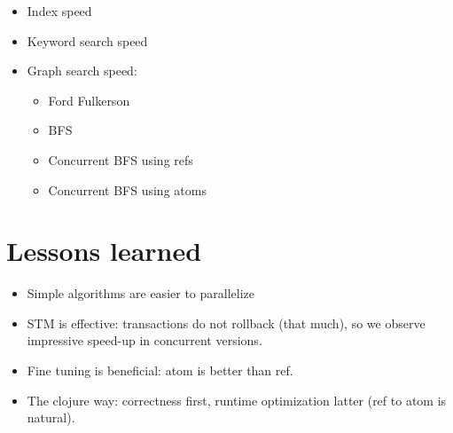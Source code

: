 			
			
			
		
		\begin{itemize}
			\item Index speed
			\item Keyword search speed
			\item Graph search speed:
				\begin{itemize}
					\item Ford Fulkerson
					\item BFS
					\item Concurrent BFS using refs
					\item Concurrent BFS using atoms
				\end{itemize}
		\end{itemize}
	
	\section{Lessons learned}
	\label{sec:lessons-learned}
	
		\begin{itemize}
			\item Simple algorithms are easier to parallelize
			\item STM is effective: transactions do not rollback (that much), so we observe impressive speed-up in concurrent versions.
			\item Fine tuning is beneficial: atom is better than ref.
			\item The clojure way: correctness first, runtime optimization latter (ref to atom is natural).
		\end{itemize}